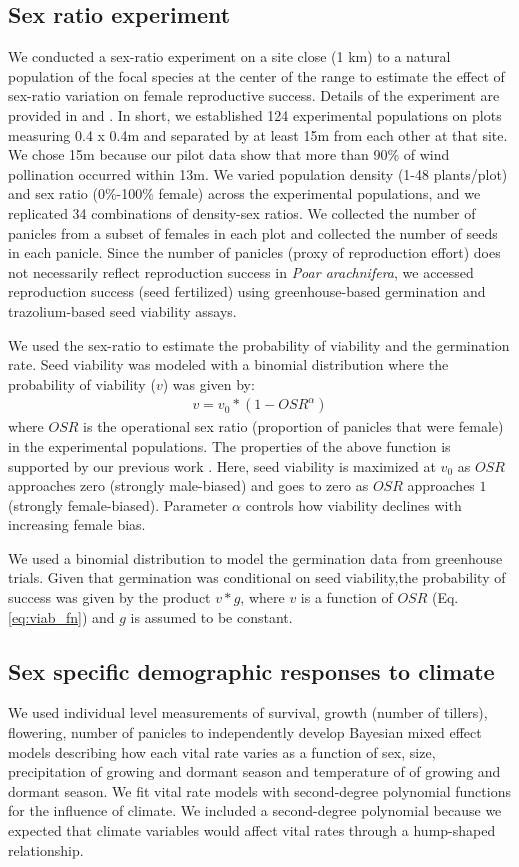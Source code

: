 \documentclass[12pt]{article}
\begin{document}
\subsection*{Sex ratio experiment}
We conducted a sex-ratio experiment on a site close (1 km) to a natural population of the focal species at the center of the range to estimate the effect of sex-ratio variation on female reproductive success.
Details of the experiment are provided in \cite{compagnoni2017can} and \cite{miller2022two}.
In short, we established 124 experimental populations on plots measuring 0.4 x 0.4m and separated by at least 15m from each other at that site. 
We chose 15m because our pilot data show that more than 90\% of wind pollination occurred within 13m. 
We varied population density (1-48 plants/plot) and sex ratio (0\%-100\% female) across the experimental populations, and we replicated 34 combinations of density-sex ratios. 
We collected the number of panicles from a subset of females in each plot and collected the number of seeds in each panicle.
Since the number of panicles (proxy of reproduction effort) does not necessarily reflect reproduction success in \textit{Poar arachnifera}, we accessed reproduction success (seed fertilized) using greenhouse-based germination and trazolium-based seed viability assays. 

We used the sex-ratio to estimate the probability of viability and the germination rate. 
Seed viability was modeled with a binomial distribution where the probability of viability ($v$) was given by:
\begin{align}\label{eq:viab_fn}
v = v_{0} * (1 - OSR^{\alpha})
\end{align}
\noindent where $OSR$ is the operational sex ratio (proportion of panicles that were female) in the experimental populations.
The properties of the above function is supported by our previous work \citep{compagnoni2017can}. 
Here, seed viability is maximized at $v_{0}$ as $OSR$ approaches zero (strongly male-biased) and goes to zero as $OSR$ approaches $1$ (strongly female-biased).
Parameter $\alpha$ controls how viability declines with increasing female bias.

We used a binomial distribution to model the germination data from greenhouse trials.
Given that germination was conditional on seed viability,the probability of success was given by the product $v*g$, where $v$ is a function of $OSR$ (Eq. \ref{eq:viab_fn}) and $g$ is assumed to be constant.

\subsection*{Sex specific demographic responses to climate}
We used individual level measurements of survival, growth (number of tillers), flowering, number of panicles to independently develop Bayesian mixed effect models describing how each vital rate varies as a function of sex, size, precipitation of growing and dormant season and temperature of of growing and dormant season. 
We fit vital rate models with second-degree polynomial functions for the influence of climate.
We included a second-degree polynomial because we expected that climate variables would affect vital rates through a hump-shaped relationship. 
\end{document}
